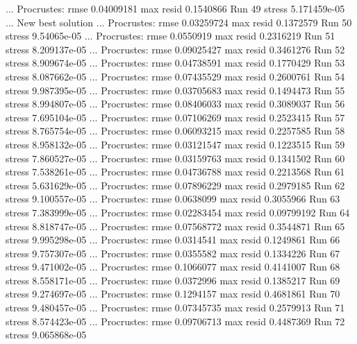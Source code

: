 \documentclass[
]{book}
\newenvironment{Shaded}{\begin{snugshade}}{\end{snugshade}}
\newcommand{\NormalTok}[1]{#1}
\begin{document}
\begin{Shaded}
\begin{Highlighting}[]
\NormalTok{... Procrustes: rmse 0.04009181  max resid 0.1540866 }
\NormalTok{Run 49 stress 5.171459e{-}05 }
\NormalTok{... New best solution}
\NormalTok{... Procrustes: rmse 0.03259724  max resid 0.1372579 }
\NormalTok{Run 50 stress 9.54065e{-}05 }
\NormalTok{... Procrustes: rmse 0.0550919  max resid 0.2316219 }
\NormalTok{Run 51 stress 8.209137e{-}05 }
\NormalTok{... Procrustes: rmse 0.09025427  max resid 0.3461276 }
\NormalTok{Run 52 stress 8.909674e{-}05 }
\NormalTok{... Procrustes: rmse 0.04738591  max resid 0.1770429 }
\NormalTok{Run 53 stress 8.087662e{-}05 }
\NormalTok{... Procrustes: rmse 0.07435529  max resid 0.2600761 }
\NormalTok{Run 54 stress 9.987395e{-}05 }
\NormalTok{... Procrustes: rmse 0.03705683  max resid 0.1494473 }
\NormalTok{Run 55 stress 8.994807e{-}05 }
\NormalTok{... Procrustes: rmse 0.08406033  max resid 0.3089037 }
\NormalTok{Run 56 stress 7.695104e{-}05 }
\NormalTok{... Procrustes: rmse 0.07106269  max resid 0.2523415 }
\NormalTok{Run 57 stress 8.765754e{-}05 }
\NormalTok{... Procrustes: rmse 0.06093215  max resid 0.2257585 }
\NormalTok{Run 58 stress 8.958132e{-}05 }
\NormalTok{... Procrustes: rmse 0.03121547  max resid 0.1223515 }
\NormalTok{Run 59 stress 7.860527e{-}05 }
\NormalTok{... Procrustes: rmse 0.03159763  max resid 0.1341502 }
\NormalTok{Run 60 stress 7.538261e{-}05 }
\NormalTok{... Procrustes: rmse 0.04736788  max resid 0.2213568 }
\NormalTok{Run 61 stress 5.631629e{-}05 }
\NormalTok{... Procrustes: rmse 0.07896229  max resid 0.2979185 }
\NormalTok{Run 62 stress 9.100557e{-}05 }
\NormalTok{... Procrustes: rmse 0.0638099  max resid 0.3055966 }
\NormalTok{Run 63 stress 7.383999e{-}05 }
\NormalTok{... Procrustes: rmse 0.02283454  max resid 0.09799192 }
\NormalTok{Run 64 stress 8.818747e{-}05 }
\NormalTok{... Procrustes: rmse 0.07568772  max resid 0.3544871 }
\NormalTok{Run 65 stress 9.995298e{-}05 }
\NormalTok{... Procrustes: rmse 0.0314541  max resid 0.1249861 }
\NormalTok{Run 66 stress 9.757307e{-}05 }
\NormalTok{... Procrustes: rmse 0.0355582  max resid 0.1334226 }
\NormalTok{Run 67 stress 9.471002e{-}05 }
\NormalTok{... Procrustes: rmse 0.1066077  max resid 0.4141007 }
\NormalTok{Run 68 stress 8.558171e{-}05 }
\NormalTok{... Procrustes: rmse 0.0372996  max resid 0.1385217 }
\NormalTok{Run 69 stress 9.274697e{-}05 }
\NormalTok{... Procrustes: rmse 0.1294157  max resid 0.4681861 }
\NormalTok{Run 70 stress 9.480457e{-}05 }
\NormalTok{... Procrustes: rmse 0.07345735  max resid 0.2579913 }
\NormalTok{Run 71 stress 8.574423e{-}05 }
\NormalTok{... Procrustes: rmse 0.09706713  max resid 0.4487369 }
\NormalTok{Run 72 stress 9.065868e{-}05 }

\end{Highlighting}
\end{Shaded}
\end{document}
